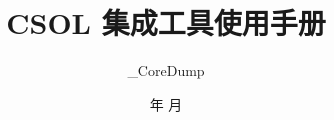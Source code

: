 \documentclass[UTF8, a4paper, oneside]{article}
\title{CSOL 集成工具使用手册}
\author{\_CoreDump}
\date{\number\year 年 \number\month 月}
\begin{document}
\maketitle
\clearpage
\tableofcontents
\clearpage

\clearpage

\clearpage

\clearpage

\clearpage

\clearpage

\clearpage

\clearpage
\begin{appendix}

\clearpage
\end{appendix}
\end{document}
